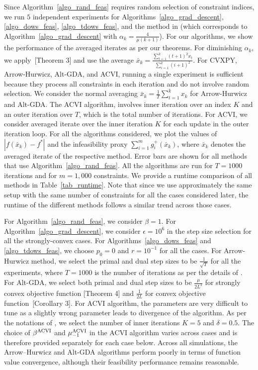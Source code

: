 \documentclass{article}
\theoremstyle{plain}
\theoremstyle{definition}
\theoremstyle{remark}
\begin{document}
Since Algorithm~\ref{algo_rand_feas} requires random selection of constraint indices, we run $5$ independent experiments for Algorithms~\ref{algo_grad_descent}, \ref{algo_dows_feas}, \ref{algo_tdows_feas}, and the method in \cite{nedic2019random} (which corresponds to Algorithm~\ref{algo_grad_descent} with $\alpha_k = \tfrac{4}{\mu(k+1)}$). For our algorithms, we show the performance of the averaged iterates as per our theorems. For diminishing $\alpha_k$, we apply~\cite{nedic2019random}[Theorem 3] and use the average $\bar x_k = \tfrac{\sum_{t=1}^k (t+1)^2 x_t}{\sum_{i=1}^k (i+1)^2}$. For CVXPY, Arrow-Hurwicz, Alt-GDA, and ACVI, running a single experiment is sufficient because they process all constraints in each iteration and do not involve random selection. We consider the normal averaging $\bar x_k = \tfrac{1}{T} \sum_{t=1}^k x_k$ for Arrow-Hurwicz and Alt-GDA. The ACVI algorithm, involves inner iteration over an index $K$ and an outer iteration over $T$, which is the total number of iterations. For ACVI, we consider averaged iterate over the inner iteration $K$ for each update in the outer iteration loop. For all the algorithms considered, we plot the values of $|f(\bar{x}_k) - f^*|$ and the infeasibility proxy $\sum_{i=1}^m g_i^+(\bar{x}_k)$, where $\bar{x}_k$ denotes the averaged iterate of the respective method. Error bars are shown for all methods that use Algorithm~\ref{algo_rand_feas}. All the algorithms are run for $T=1000$ iterations and for $m = 1,000$ constraints. We provide a runtime comparison of all methods in Table~\ref{tab_runtime}. Note that since we use approximately the same setup with the same number of constraints for all the cases considered later, the runtime of the different methods follows a similar trend across those cases.


For Algorithm~\ref{algo_rand_feas}, we consider $\beta = 1$. For Algorithm~\ref{algo_grad_descent}, we consider $\epsilon = 10^6$ in the step size selection for all the strongly-convex cases. For Algorithms~\ref{algo_dows_feas} and \ref{algo_tdows_feas}, we choose $p_0 = 0$ and $r = 10^{-1}$ for all the cases. For Arrow-Hurwicz method, we select the primal and dual step sizes to be $\tfrac{1}{\sqrt{T}}$ for all the experiments, where $T = 1000$ is the number of iterations as per the details of \cite{he2022convergence}. For Alt-GDA, we select both primal and dual step sizes to be $\tfrac{\mu}{2L^2}$ for strongly convex objective function \cite{zhang2022near}[Theorem 4] and $\tfrac{1}{2L}$ for convex objective function~\cite{zhang2022near}[Corollary 3]. For ACVI algorithm, the parameters are very difficult to tune as a slightly wrong parameter leads to divergence of the algorithm. As per the notations of \cite{yang2022solving}, we select the number of inner iterations $K=5$ and $\delta = 0.5$. The choice of $\beta^{\rm ACVI}$ and $\mu_{-1}^{\rm ACVI}$ in the ACVI algorithm varies across cases and is therefore provided separately for each case below. Across all simulations, the Arrow–Hurwicz and Alt-GDA algorithms perform poorly in terms of function value convergence, although their feasibility performance remains reasonable.
\end{document}
